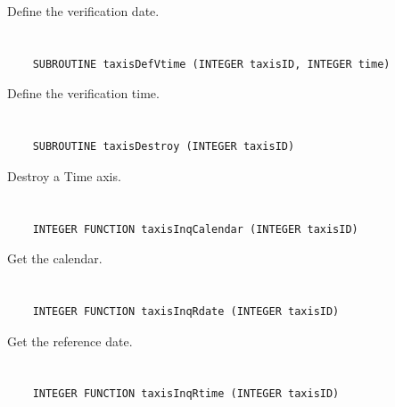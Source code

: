 Define the verification date.


\section*{\tt {}}

\begin{verbatim}
    SUBROUTINE taxisDefVtime (INTEGER taxisID, INTEGER time)
\end{verbatim}

Define the verification time.


\section*{\tt {}}

\begin{verbatim}
    SUBROUTINE taxisDestroy (INTEGER taxisID)
\end{verbatim}

Destroy a Time axis.


\section*{\tt {}}

\begin{verbatim}
    INTEGER FUNCTION taxisInqCalendar (INTEGER taxisID)
\end{verbatim}

Get the calendar.


\section*{\tt {}}

\begin{verbatim}
    INTEGER FUNCTION taxisInqRdate (INTEGER taxisID)
\end{verbatim}

Get the reference date.


\section*{\tt {}}

\begin{verbatim}
    INTEGER FUNCTION taxisInqRtime (INTEGER taxisID)
\end{verbatim}

